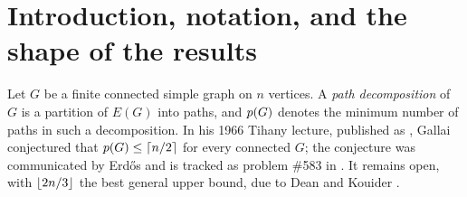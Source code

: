 \section{Introduction, notation, and the shape of the results}\label{sec:intro}

Let $G$ be a finite connected simple graph on $n$ vertices. A \emph{path decomposition} of
$G$ is a partition of $E(G)$ into paths, and $p(G)$ denotes the minimum number of paths in
such a decomposition. In his 1966 Tihany lecture, published as \cite{Gallai68}, Gallai
conjectured that $p(G)\le\left\lceil n/2 \right\rceil$ for every connected $G$; the conjecture was
communicated by Erd\H{o}s and is tracked as problem \#583 in \cite{EP583}. It remains open,
with $\left\lfloor 2n/3 \right\rfloor$ the best general upper bound, due to Dean and Kouider \cite{DK00}.

